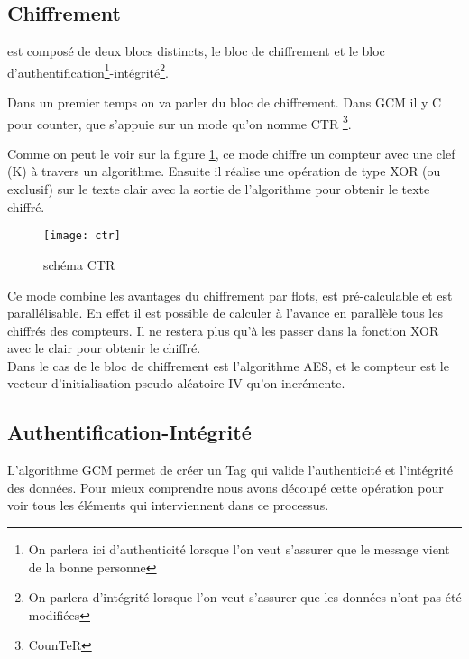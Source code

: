 \subsection{Chiffrement}

\aes est composé de deux blocs distincts, le bloc de chiffrement et le bloc d'authentification\footnote{On parlera ici d'authenticité lorsque l'on veut s'assurer que le message vient de la bonne personne}-intégrité\footnote{On parlera d'intégrité lorsque l'on veut s'assurer que les données n'ont pas été modifiées}.

Dans un premier temps on va parler du bloc de chiffrement. Dans GCM il y C pour \og counter\fg{}, \cad que \aes s'appuie sur un mode qu'on nomme CTR \footnote{CounTeR}.

Comme on peut le voir sur la figure \ref{schema CTR}, ce mode chiffre un compteur avec une clef (K) à travers un algorithme. Ensuite il réalise une opération de type XOR (ou exclusif) sur le texte clair avec la sortie de l'algorithme pour obtenir le texte chiffré.

\begin{figure}[!h]
  \centering
  \texttt{[image: ctr]}
  \caption{schéma CTR \cite{wiki}}
  \label{schema CTR}
\end{figure}

 Ce mode combine les avantages du chiffrement par flots, est pré-calculable et est parallélisable. En effet il est possible de calculer à l'avance en parallèle tous les chiffrés des compteurs. Il ne restera plus qu'à les passer dans la fonction XOR avec le clair pour obtenir le chiffré.
 ~\\

 Dans le cas de \aes le bloc de chiffrement est l'algorithme AES, et le compteur est le vecteur d'initialisation pseudo aléatoire IV qu'on incrémente.


\subsection{Authentification-Intégrité}

L'algorithme GCM permet de créer un Tag qui valide l'authenticité et l'intégrité des données. Pour mieux comprendre nous avons découpé cette opération pour voir tous les éléments qui interviennent dans ce processus.


